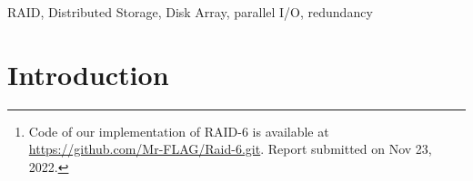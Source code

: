 \documentclass[journal]{IEEEtran}
\begin{document}
\begin{abstract}
The concept of Redundant Arrays of Inexpensive Disks (RAID) was introduced in 1988 to increase the I/O bandwidth match with the CPU and Memory's performance. Later, RAID technology was accepted as the industry standard storage solution. It offers features including fault tolerance, performance boost, and cost reduction. One of the configurations, RAID-6, due to its greater fault tolerance and decent performance, has been widely used in data protection and in cloud-based architectures. In this project, we developed a RAID-6 based distributed storage system based on Galois Field theory and Reed-Solomon Coding. We implemented advanced features: support for arbitrary data object size, adjustable RAID chuck size, user-adjustable configuration, and performance simulation\footnote{Code of our implementation of RAID-6 is available at \url{https://github.com/Mr-FLAG/Raid-6.git}. Report submitted on Nov 23, 2022.}.

\end{abstract}

\begin{IEEEkeywords}
RAID, Distributed Storage, Disk Array, parallel I/O, redundancy
\end{IEEEkeywords}

%
\IEEEpeerreviewmaketitle



\section{Introduction}
\end{document}
